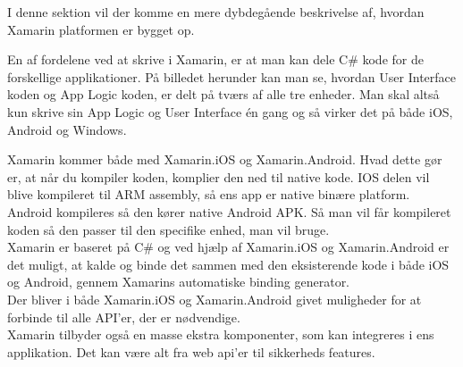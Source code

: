 		I denne sektion vil der komme en mere dybdegående beskrivelse af, hvordan Xamarin platformen er bygget op.
		
		En af fordelene ved at skrive i Xamarin, er at man kan dele C\# kode for de forskellige applikationer.
		På billedet herunder kan man se, hvordan User Interface koden og App Logic koden, er delt på tværs af alle tre enheder. Man skal altså kun skrive sin App Logic og User Interface én gang og så virker det på både iOS, Android og Windows.
		
		Xamarin kommer både med Xamarin.iOS og Xamarin.Android. Hvad dette gør er, at når du kompiler koden, komplier den ned til native kode. IOS delen vil blive kompileret til ARM assembly, så ens app er native binære platform. Android kompileres så den kører native Android APK. Så man vil får kompileret koden så den passer til den specifike enhed, man vil bruge. \\
		Xamarin er baseret på C\# og ved hjælp af Xamarin.iOS og Xamarin.Android er det muligt, at kalde og binde det sammen med den eksisterende kode i både iOS og Android, gennem Xamarins automatiske binding generator. \\
		Der bliver i både Xamarin.iOS og Xamarin.Android givet muligheder for at forbinde til alle API'er, der er nødvendige. \\
		
		Xamarin tilbyder også en masse ekstra komponenter, som kan integreres i ens applikation. Det kan være alt fra web api'er til sikkerheds features.
			